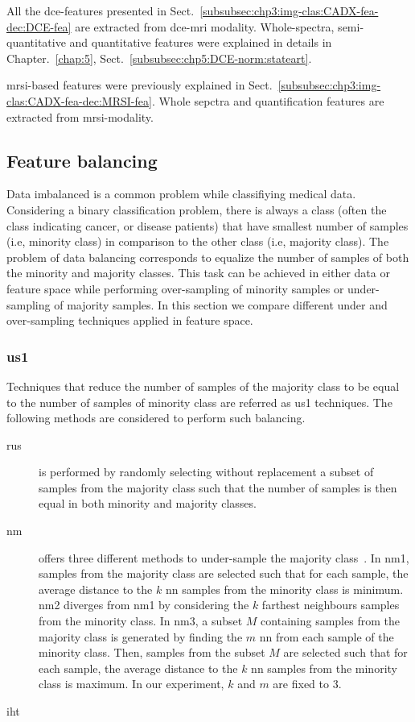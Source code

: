 All the \ac{dce}-features presented in Sect.~\ref{subsubsec:chp3:img-clas:CADX-fea-dec:DCE-fea} are extracted from \ac{dce}-\ac{mri} modality.
Whole-spectra, semi-quantitative and quantitative features were explained in details in Chapter.~\ref{chap:5}, Sect.~\ref{subsubsec:chp5:DCE-norm:stateart}.

\ac{mrsi}-based features were previously explained in Sect.~\ref{subsubsec:chp3:img-clas:CADX-fea-dec:MRSI-fea}. 
Whole sepctra and quantification features are extracted from \ac{mrsi}-modality.
  
\subsection{Feature balancing}\label{subsec:chp6:method:fea-bal}
Data imbalanced is a common problem while classifiying medical data.
Considering a binary classification problem, there is always a class (often the class indicating cancer, or disease patients) that have smallest number of samples (i.e, minority class) in comparison to the other class (i.e, majority class).
The problem of data balancing corresponds to equalize the number of samples of both the minority and majority classes.
This task can be achieved in either data or feature space while performing over-sampling of minority samples or under-sampling of majority samples.
In this section we compare different under and over-sampling techniques applied in feature space.

\subsubsection{\Acl*{us1}}
Techniques that reduce the number of samples of the majority class to be equal to the number of samples of minority class are referred as \ac{us1} techniques.
The following methods are considered to perform such balancing.

\begin{description}
  \item[\Ac{rus}] is performed by randomly selecting without replacement a subset of samples from the majority class such that the number of samples is then equal in both minority and majority classes.
  \item[\Ac{nm}] offers three different methods to under-sample the majority class~\cite{mani2003knn}.
In \ac{nm1}, samples from the majority class are selected such that for each sample, the average distance to the $k$ \ac{nn} samples from the minority class is minimum.
\ac{nm2} diverges from \ac{nm1} by considering the $k$ farthest neighbours samples from the minority class.
In \ac{nm3}, a subset $M$ containing samples from the majority class is generated by finding the $m$ \ac{nn} from each sample of the minority class.
Then, samples from the subset $M$ are selected such that for each sample, the average distance to the $k$ \ac{nn} samples from the minority class is maximum.
In our experiment, $k$ and $m$ are fixed to 3.
\item[\Ac{iht}]
\end{description}

